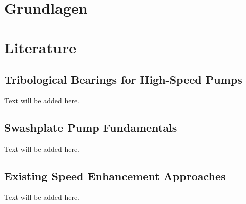   {\chapter{Grundlagen}}
  {\chapter{Literature}}
\label{sec:background}

\section{Tribological Bearings for High-Speed Pumps}
Text will be added here.

\section{Swashplate Pump Fundamentals}
Text will be added here.

\section{Existing Speed Enhancement Approaches}
Text will be added here.

